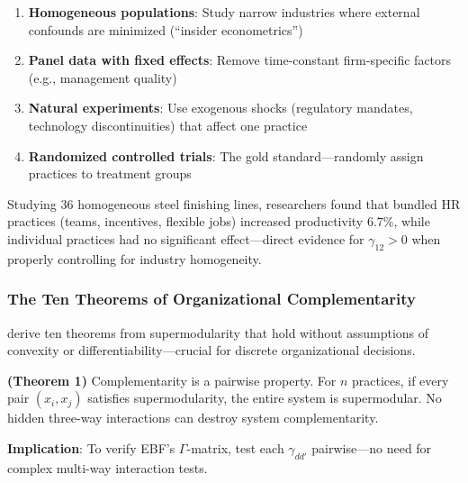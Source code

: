 \begin{enumerate}
    \item \textbf{Homogeneous populations}: Study narrow industries where external 
    confounds are minimized (``insider econometrics'')
    
    \item \textbf{Panel data with fixed effects}: Remove time-constant firm-specific 
    factors (e.g., management quality)
    
    \item \textbf{Natural experiments}: Use exogenous shocks (regulatory mandates, 
    technology discontinuities) that affect one practice
    
    \item \textbf{Randomized controlled trials}: The gold standard---randomly assign 
    practices to treatment groups
\end{enumerate}

\begin{example}[Ichniowski et al. 1997]
Studying 36 homogeneous steel finishing lines, researchers found that bundled 
HR practices (teams, incentives, flexible jobs) increased productivity 6.7\%, 
while individual practices had no significant effect---direct evidence for 
$\gamma_{12} > 0$ when properly controlling for industry homogeneity.
\end{example}

\subsubsection{The Ten Theorems of Organizational Complementarity}

\citet{brynjolfsson2013complementarities} derive ten theorems from supermodularity 
that hold without assumptions of convexity or differentiability---crucial for 
discrete organizational decisions.

\begin{theorem}
\label{thm:pairwise}
\textbf{(Theorem 1)} Complementarity is a pairwise property. For $n$ practices, 
if every pair $(x_i, x_j)$ satisfies supermodularity, the entire system is 
supermodular. No hidden three-way interactions can destroy system complementarity.
\end{theorem}

\textbf{Implication}: To verify EBF's $\Gamma$-matrix, test each $\gamma_{dd'}$ 
pairwise---no need for complex multi-way interaction tests.

